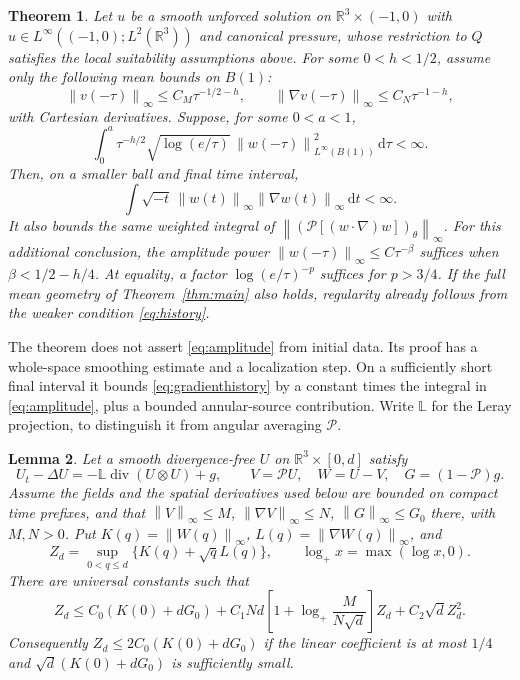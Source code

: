 \documentclass[11pt]{article}
\newtheorem{theorem}{Theorem}
\newtheorem{lemma}[theorem]{Lemma}
\theoremstyle{remark}
\newcommand{\R}{\mathbb R}
\newcommand{\PP}{\mathcal P}
\newcommand{\dd}{\,\mathrm d}
\newcommand{\norm}[1]{\left\lVert#1\right\rVert}
\newcommand{\diver}{\operatorname{div}}
\begin{document}
\begin{theorem}\label{thm:amplitude}
Let $u$ be a smooth unforced solution on $\R^3\times(-1,0)$ with
$u\in L^\infty((-1,0);L^2(\R^3))$ and canonical pressure, whose
restriction to $Q$ satisfies the local suitability assumptions above.
For some $0<h<1/2$, assume only the following mean bounds on $B(1)$:
\begin{equation}\label{eq:localMeanLip}
 \norm{v(-\tau)}_\infty\leq C_M\tau^{-1/2-h},\qquad
 \norm{\nabla v(-\tau)}_\infty\leq C_N\tau^{-1-h},
\end{equation}
with Cartesian derivatives. Suppose, for some $0<a<1$,
\begin{equation}\label{eq:amplitude}
 \int_0^a \tau^{-h/2}\sqrt{\log(e/\tau)}\,
               \norm{w(-\tau)}_{L^\infty(B(1))}^2\dd\tau<\infty.
\end{equation}
Then, on a smaller ball and final time interval,
\begin{equation}\label{eq:gradienthistory}
 \int\sqrt{-t}\,\norm{w(t)}_\infty\norm{\nabla w(t)}_\infty\dd t<\infty.
\end{equation}
It also bounds the same weighted integral of
$\norm{(\PP[(w\cdot\nabla)w])_\theta}_\infty$.
For this additional conclusion, the amplitude power
$\norm{w(-\tau)}_\infty\leq C\tau^{-\beta}$ suffices when
$\beta<1/2-h/4$. At equality, a factor $\log(e/\tau)^{-p}$ suffices
for $p>3/4$. If the full mean geometry of Theorem~\ref{thm:main}
also holds, regularity already follows from the weaker condition
\eqref{eq:history}.
\end{theorem}

The theorem does not assert \eqref{eq:amplitude} from initial data.
Its proof has a whole-space smoothing estimate and a localization step.
On a sufficiently short final interval it bounds
\eqref{eq:gradienthistory} by a constant times the integral in
\eqref{eq:amplitude}, plus a bounded annular-source contribution.
Write $\mathbb L$ for the Leray projection, to distinguish it from
angular averaging $\PP$.

\begin{lemma}\label{lem:window}
Let a smooth divergence-free $U$ on $\R^3\times[0,d]$ satisfy
\[
 U_t-\Delta U=-\mathbb L\diver(U\otimes U)+g,
 \qquad V=\PP U,\quad W=U-V,\quad G=(1-\PP)g.
\]
Assume the fields and the spatial derivatives used below are bounded on
compact time prefixes, and that
$\norm V_\infty\leq M$, $\norm{\nabla V}_\infty\leq N$,
$\norm G_\infty\leq G_0$ there, with $M,N>0$.
Put $K(q)=\norm{W(q)}_\infty$, $L(q)=\norm{\nabla W(q)}_\infty$, and
\[
 Z_d=\sup_{0<q\leq d}\{K(q)+\sqrt q L(q)\},
 \qquad \log_+x=\max(\log x,0).
\]
There are universal constants such that
\begin{equation}\label{eq:window}
 Z_d\leq C_0(K(0)+dG_0)
 +C_1Nd\left[1+\log_+\frac{M}{N\sqrt d}\right]Z_d
 +C_2\sqrt d Z_d^2.
\end{equation}
Consequently $Z_d\leq2C_0(K(0)+dG_0)$ if the linear coefficient
is at most $1/4$ and $\sqrt d(K(0)+dG_0)$ is sufficiently small.
\end{lemma}
\end{document}
